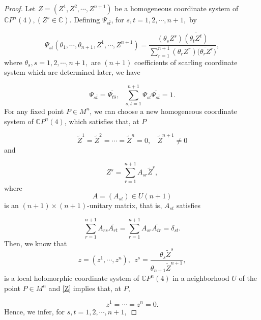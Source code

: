 \documentclass[12pt]{article}
\numberwithin{equation}{section}
\begin{document}
\begin{proof}
Let $Z=(Z^{1},Z^{2},\cdots,Z^{n+1})$ be a homogeneous coordinate
system of $\mathbb{C}P^{n}(4), (Z^{s}\in \mathbb{C})$. Defining $\Psi_{s\overline{t}}$, for $s,t = 1, 2,\cdots,n+1,$ by

\begin{equation*}\Psi_{s\overline{t}}(\theta_{1},\cdots,\theta_{n+1},Z^{1},\cdots,Z^{n+1})
=\frac{(\theta_{s}Z^{s})\overline{(\theta_{t}Z^{t})}}{\sum^{n+1}_{r=1}(\theta_{r}Z^{r})\overline{(\theta_{r}Z^{r}})},
\end{equation*}where $\theta_{s}, s= 1,2,\cdots,n+1,$ are $(n+1)$ coefficients of scarling coordinate system which are determined later,
we have

\begin{equation*}\Psi_{s\overline{t}} = \overline{\Psi_{t\overline{s}}},\ \ \ \sum^{n+1}_{s,t=1}\Psi_{s\overline{t}}\overline{\Psi_{s\overline{t}}} = 1.\end{equation*}
For any fixed point $P\in M^{n}$, we can choose a new homogeneous coordinate system of
$\mathbb{C}P^{n}(4)$, which satisfies that, at $P$


\begin{equation}\label{Z}\widetilde{Z}^{1}=\widetilde{Z}^{2}=\cdots=\widetilde{Z}^{n}=0,\ \ \ \ \widetilde{Z}^{n+1}\neq0
\end{equation} and



\begin{equation*}Z^{s}=\sum^{n+1}_{r=1}A_{sr}\widetilde{Z}^{r},
\end{equation*}
where $$A= (A_{st})\in U(n + 1)$$ is an $(n+1)\times(n+1)$-unitary matrix, that is, $A_{st}$ satisfies


\begin{equation*} \sum^{n+1}_{r=1}A_{rs}\overline{A_{rt}}=\sum^{n+1}_{r=1}A_{sr}\overline{A_{tr}}=\delta_{st}.
\end{equation*}
Then, we know that $$z = (z^{1},\cdots,z^{n}),\ \ z^{s}=\frac{\theta_{s}\widetilde{Z}^{s}}{\theta_{n+1}\widetilde{Z}^{n+1}},$$ is a local holomorphic coordinate
system of $\mathbb{C}P^{n}(4)$ in a neighborhood $U$ of the point $P\in M^{n}$ and \eqref{Z} implies that,  at $P$,

\begin{equation*}z^{1}=\cdots=z^{n}=0.\end{equation*}
Hence, we infer, for $s,t = 1,2,\cdots,n+1,$




\end{proof}
\end{document}
